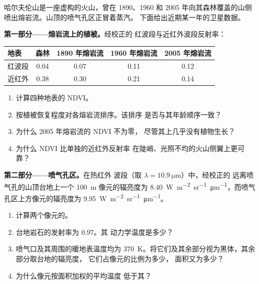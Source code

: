 \begin{problem}
\label{pb:b3:remote-sensing-gis:1}
哈尔夫伦山是一座虚构的火山，曾在 1890、1960
和 2005 年向其森林覆盖的山侧喷出熔岩流。山顶的喷气孔区正冒着蒸汽。
下面给出近期某一年的卫星数据。

\medskip\noindent\textbf{第一部分——熔岩流上的植被。}经校正的
红波段与近红外波段反射率：
\begin{center}
\small
\begin{tabular}{lcccc}
\hline
地表 & 森林 & 1890 年熔岩流 & 1960 年熔岩流 & 2005 年熔岩流 \\
\hline
红波段 & 0.04 & 0.07 & 0.11 & 0.12 \\
近红外 & 0.38 & 0.30 & 0.21 & 0.14 \\
\hline
\end{tabular}
\end{center}
\begin{enumerate}
\item 计算四种地表的 NDVI。
\item 按植被恢复程度对各熔岩流排序。该排序
  是否与其年龄顺序一致？
\item 为什么 2005 年熔岩流的 NDVI 不为零，
  尽管其上几乎没有植物生长？
\item 为什么 NDVI 比单独的近红外反射率
  在陡峭、光照不均的火山侧翼上更可靠？
\end{enumerate}

\medskip\noindent\textbf{第二部分——喷气孔区。}在热红外
波段（取 $\lambda = \qty{10.9}{\micro\metre}$）中，经校正的
远离喷气孔的山顶台地上一个 \qty{100}{m} 像元的辐亮度为
\qty{8.40}{W.m^{-2}.sr^{-1}.\micro\metre^{-1}}，而喷气孔区上方像元的辐亮度为
\qty{9.95}{W.m^{-2}.sr^{-1}.\micro\metre^{-1}}。
\begin{enumerate}[resume]
\item 计算两个像元的。
\item 台地岩石的发射率为 0.97。其
  动力学温度是多少？
\item 喷气口及其周围的暖地表温度均为
  \qty{370}{K}。将它们及其余部分视为黑体，其余部分取台地的辐亮度，
  它们占像元的比例为多少，
  面积又为多少？
\item 为什么像元按面积加权的平均温度
  低于其？
\end{enumerate}


\end{problem}

